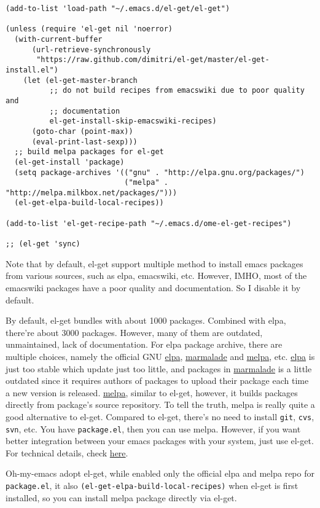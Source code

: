 \documentclass[11pt]{article}
\begin{document}
\begin{verbatim}
(add-to-list 'load-path "~/.emacs.d/el-get/el-get")

(unless (require 'el-get nil 'noerror)
  (with-current-buffer
      (url-retrieve-synchronously
       "https://raw.github.com/dimitri/el-get/master/el-get-install.el")
    (let (el-get-master-branch
          ;; do not build recipes from emacswiki due to poor quality and
          ;; documentation
          el-get-install-skip-emacswiki-recipes)
      (goto-char (point-max))
      (eval-print-last-sexp)))
  ;; build melpa packages for el-get
  (el-get-install 'package)
  (setq package-archives '(("gnu" . "http://elpa.gnu.org/packages/")
                           ("melpa" . "http://melpa.milkbox.net/packages/")))
  (el-get-elpa-build-local-recipes))

(add-to-list 'el-get-recipe-path "~/.emacs.d/ome-el-get-recipes")

;; (el-get 'sync)
\end{verbatim}

Note that by default, el-get support multiple method to install emacs packages
from various sources, such as elpa, emacswiki, etc. However, IMHO, most of the
emacswiki packages have a poor quality and documentation. So I disable it by
default.

By default, el-get bundles with about 1000 packages. Combined with elpa,
there're about 3000 packages. However, many of them are outdated, unmaintained,
lack of documentation. For elpa package archive, there are multiple choices,
namely the official GNU \href{http://elpa.gnu.org/}{elpa}, \href{http://marmalade-repo.org/}{marmalade} and \href{http://melpa.milkbox.net/}{melpa}, etc. \href{http://elpa.gnu.org/}{elpa} is just too stable
which update just too little, and packages in \href{http://marmalade-repo.org/}{marmalade} is a little outdated
since it requires authors of packages to upload their package each time a
new version is released. \href{http://melpa.milkbox.net/}{melpa}, similar to el-get, however, it builds packages
directly from package's source repository. To tell the truth, melpa is really
quite a good alternative to el-get. Compared to el-get, there's no need to
install \texttt{git}, \texttt{cvs}, \texttt{svn}, etc. You have \texttt{package.el}, then you can use
melpa. However, if you want better integration between your emacs packages with
your system, just use el-get. For technical details, check \href{https://github.com/milkypostman/melpa/issues/742}{here}.

Oh-my-emacs adopt el-get, while enabled only the official elpa and melpa repo
for \texttt{package.el}, it also \texttt{(el-get-elpa-build-local-recipes)} when el-get is
first installed, so you can install melpa package directly via el-get.
\end{document}
